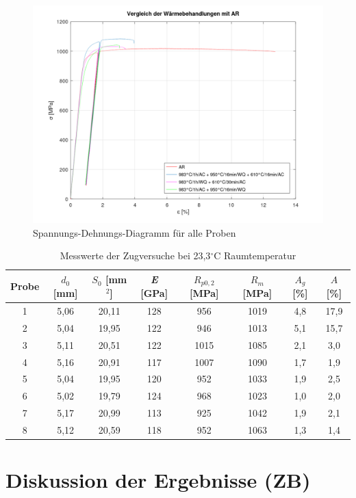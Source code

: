 \begin{figure}
	\centering
	\includegraphics[width=0.8\linewidth]{./Bilder/Vergleich aller Proben}
	\caption{Spannungs-Dehnungs-Diagramm für alle Proben}
	\label{fig:vergleich-alle-proben}
\end{figure}

\begin{table}
	\centering
	\begin{tabular}{|c|c|c|c|c|c|c|c|}
		\hline
		Probe & $d_0$ [mm] & $S_0$ [mm$^2$] & \textit{E} [GPa] & $R_{p0,2}$ [MPa]& $R_m$ [MPa]& $A_g$ [\%]& $A$ [\%]\\
		\hline
		1 & 5,06 & 20,11 & 128 & 956 & 1019&4,8&17,9 \\
		\hline
		2 &5,04&19,95&122&946&1013&5,1&15,7\\
		\hline
		3 & 5,11&20,51& 122&1015&1085&2,1&3,0\\
		\hline
		4 &5,16& 20,91& 117 & 1007& 1090& 1,7&  1,9 \\
		\hline
		5&5,04 &19,95& 120& 952& 1033& 1,9 &2,5\\
		\hline
		6 &5,02& 19,79& 124& 968& 1023 &1,0 & 2,0\\
		\hline
		7&5,17& 20,99& 113& 925& 1042& 1,9& 2,1\\
		\hline
		8 & 5,12 & 20,59 & 118 & 952 & 1063 & 1,3 & 1,4\\
		\hline
	\end{tabular}
	\caption{Messwerte der Zugversuche bei 23,3$^\circ$C Raumtemperatur}
	\label{tab:zugversuche}
	
\end{table}

\pagebreak

\section{Diskussion der Ergebnisse (ZB)}

